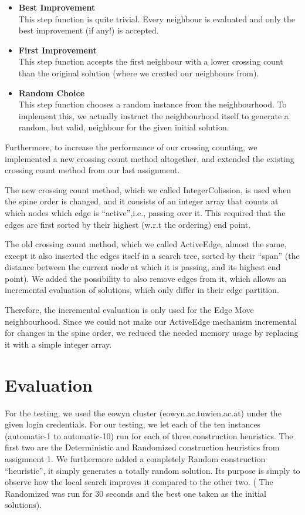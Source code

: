 \documentclass [11pt]{article}
\begin{document}
\begin{itemize}
  \item \textbf{ Best Improvement} \\
  This step function is quite trivial. Every neighbour is evaluated and only the best improvement (if any!) is accepted. 
  \item \textbf{ First Improvement} \\
  This step function accepts the first neighbour with a lower crossing count than the original solution (where we created our neighbours from).
   \item \textbf{ Random Choice} \\
  This step function chooses a random instance from the neighbourhood. To implement this, we actually instruct the neighbourhood itself to generate a random, but valid, neighbour for the given initial solution.
\end{itemize}



Furthermore, to increase the performance of our crossing counting, we implemented a new crossing count method altogether, and extended the existing crossing count method from our last assignment. 

The new crossing count method, which we called IntegerColission, is used when the spine order is changed, and it consists of an integer array that counts at which nodes which edge is ``active'',i.e., passing over it. This required that the edges are first sorted by their highest (w.r.t the ordering) end point. 

The old crossing count method, which we called ActiveEdge, almost the same, except it also inserted the edges itself in a search tree, sorted by their ``span'' (the distance between the current node at which it is passing, and its highest end point). We added the possibility to also remove edges from it, which allows an incremental evaluation of solutions, which only differ in their edge partition. 

Therefore, the incremental evaluation is only used for the Edge Move neighbourhood. Since we could not make our ActiveEdge mechanism incremental for changes in the spine order, we reduced the needed memory usage by replacing it with a simple integer array.


\section{Evaluation}
For the testing, we used the eowyn cluster (eowyn.ac.tuwien.ac.at) under the given login credentials. For our testing, we let each of the ten instances (automatic-1 to automatic-10) run for each of three construction heuristics. The first two are the Deterministic and Randomized construction heuristics from assignment 1. We furthermore added a completely Random construction ``heuristic'', it simply generates a totally random solution. Its purpose is simply to observe how the local search improves it compared to the other two. ( The Randomized was run for 30 seconds and the best one taken as the initial solutions). 
\end{document}
